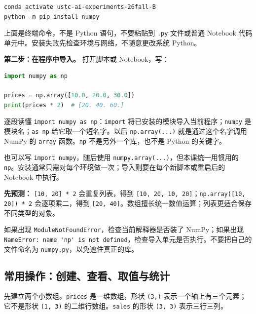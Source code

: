 \documentclass[UTF8,a4paper,11pt,fontset=fandol]{ctexart}
\providecommand{\passthrough}[1]{#1}
\begin{document}
\begin{lstlisting}[language={}]
conda activate ustc-ai-experiments-26fall-B
python -m pip install numpy
\end{lstlisting}

上面是终端命令，不是 Python 语句，不要粘贴到 \passthrough{\lstinline!.py!} 文件或普通 Notebook 代码单元中。安装失败先检查环境与网络，不随意更改系统 Python。

\textbf{第二步：在程序中导入。} 打开脚本或 Notebook，写：

\begin{lstlisting}[language=Python]
import numpy as np

prices = np.array([10.0, 20.0, 30.0])
print(prices * 2)  # [20. 40. 60.]
\end{lstlisting}

逐段读懂 \passthrough{\lstinline!import numpy as np!}：\passthrough{\lstinline!import!} 将已安装的模块导入当前程序；\passthrough{\lstinline!numpy!} 是模块名；\passthrough{\lstinline!as np!} 给它取一个短名字。以后 \passthrough{\lstinline!np.array(...)!} 就是通过这个名字调用 NumPy 的 \passthrough{\lstinline!array!} 函数。\passthrough{\lstinline!np!} 不是另外一个库，也不是 Python 的关键字。

也可以写 \passthrough{\lstinline!import numpy!}，随后使用 \passthrough{\lstinline!numpy.array(...)!}，但本课统一用惯用的 \passthrough{\lstinline!np!}。安装通常只需对每个环境做一次；导入则要在每个新脚本或重启后的 Notebook 中执行。

\textbf{先预测：} \passthrough{\lstinline![10, 20] * 2!} 会重复列表，得到 \passthrough{\lstinline![10, 20, 10, 20]!}；\passthrough{\lstinline!np.array([10, 20]) * 2!} 会逐项乘二，得到 \passthrough{\lstinline![20, 40]!}。数组擅长统一数值运算；列表更适合保存不同类型的对象。

如果出现 \passthrough{\lstinline!ModuleNotFoundError!}，检查当前解释器是否装了 NumPy；如果出现 \passthrough{\lstinline!NameError: name 'np' is not defined!}，检查导入单元是否执行。不要把自己的文件命名为 \passthrough{\lstinline!numpy.py!}，以免遮住真正的库。

\clearpage

\subsection{常用操作：创建、查看、取值与统计}\label{ux5e38ux7528ux64cdux4f5cux521bux5efaux67e5ux770bux53d6ux503cux4e0eux7edfux8ba1}

先建立两个小数组。\passthrough{\lstinline!prices!} 是一维数组，形状 \passthrough{\lstinline!(3,)!} 表示一个轴上有三个元素；它不是形状 \passthrough{\lstinline!(1, 3)!} 的二维行数组。\passthrough{\lstinline!sales!} 的形状 \passthrough{\lstinline!(3, 3)!} 表示三行三列。
\end{document}
